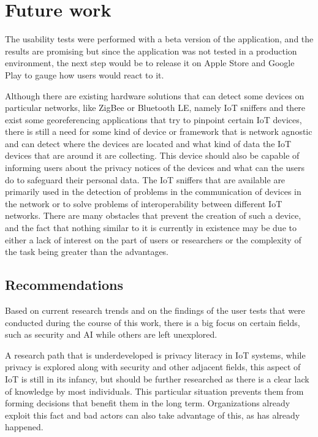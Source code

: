 %
%
\section{Future work}\label{section:future_work}

The usability tests were performed with a beta version of the application,
and the results are promising but since the application was not tested in a production environment,
the next step would be to release it on Apple Store and Google Play to
gauge how users would react to it.

Although there are existing hardware solutions that can detect some devices
on particular networks, like ZigBee or Bluetooth LE, namely IoT sniffers
and there exist some georeferencing applications that try to pinpoint certain
IoT devices, there is still a need for some kind of device or framework
that is network agnostic and can detect where the devices are located and
what kind of data the IoT devices that are around it are collecting. This
device should also be capable of informing users about the privacy notices
of the devices and what can the users do to safeguard their personal data.
The IoT sniffers that are available are primarily used in the detection
of problems in the communication of devices in the network or to solve problems
of interoperability between different IoT networks. There are many obstacles
that prevent the creation of such a device, and the fact that nothing similar
to it is currently in existence may be due to either a lack of interest on the
part of users or researchers or the complexity of the task being greater than
the advantages.

\subsection{Recommendations}

Based on current research trends and on the findings of the user tests that were
conducted during the course of this work, there is a big focus on certain
fields, such as security and AI while others are left unexplored.

A research path that is underdeveloped is privacy literacy in IoT systems,
while privacy is explored along with security and other adjacent fields, this aspect of IoT
is still in its infancy, but should be further researched as there is a
clear lack of knowledge by most individuals. This particular situation prevents
them from forming decisions that benefit them in the long term. Organizations
already exploit this fact and bad actors can also take advantage of this, as
has already happened.

